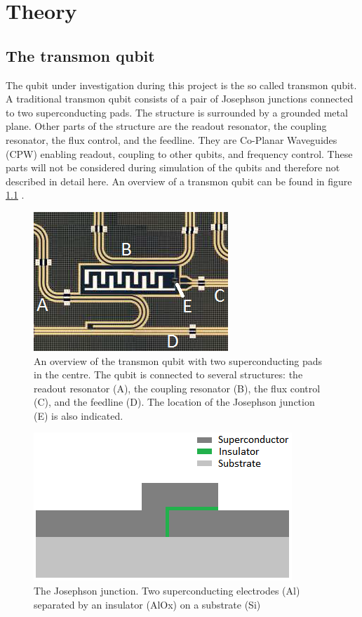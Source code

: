\chapter{Theory}

\section{The transmon qubit}
The qubit under investigation during this project is the so called transmon qubit. A traditional transmon qubit consists of a pair of Josephson junctions connected to two superconducting pads. The structure is surrounded by a grounded metal plane. Other parts of the structure are the readout resonator, the coupling resonator, the flux control, and the feedline. They are Co-Planar Waveguides (CPW) enabling readout, coupling to other qubits, and frequency control. These parts will not be considered during simulation of the qubits and therefore not described in detail here. An overview of a transmon qubit can be found in figure \ref{fig:transmonblueprint} \cite{Riste2014}.

\begin{figure}
	\begin{center}
		\includegraphics[scale=1]{Figures/Transmon/transmonblueprint_zoomed2}
		\caption{An overview of the transmon qubit with two superconducting pads in the centre. The qubit is connected to several structures: the readout resonator (A), the coupling resonator (B), the flux control (C), and the feedline (D). The location of the Josephson junction (E) is also indicated.}
		\label{fig:transmonblueprint}
	\end{center}
\end{figure}

\begin{figure}
	\begin{center}
		\includegraphics[scale=1]{Figures/Transmon/JJ}
		\caption{The Josephson junction. Two superconducting electrodes (Al) separated by an insulator (AlOx) on a substrate (Si)}
		\label{fig:JJ}
	\end{center}
\end{figure}

